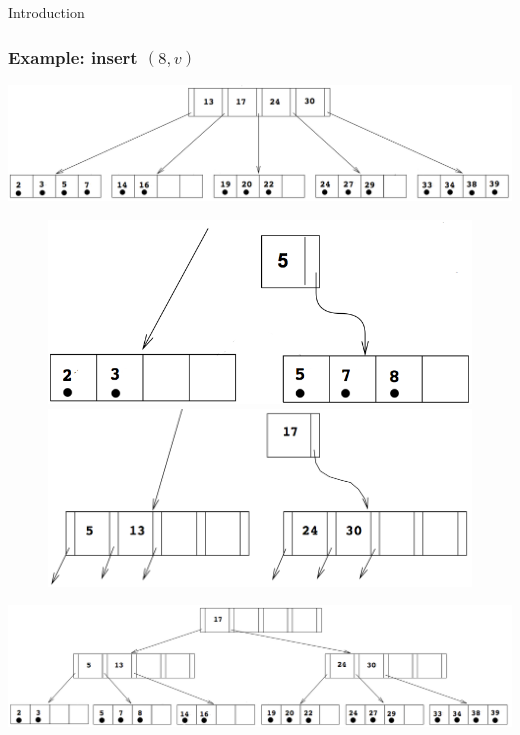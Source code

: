 \documentclass{beamer}
\begin{document}
\begin{section}{Introduction}
    \begin{frame}
      \frametitle{Example: insert $(8,v)$}
      \vspace{-1em}
      \begin{center}
      \includegraphics[scale=0.17]{B+Tree.png}
      \end{center}
      \pause
      \vspace{-2em}
      \begin{figure}[!ht]
        \centering
        \begin{center}
          \includegraphics[valign=t,scale=0.15]{B+Tree_op1.png}
          \quad
          \pause
          \includegraphics[valign=t,scale=0.15]{B+Tree_op2.png}
        \end{center}
      \end{figure}
      \pause

      \begin{center}
      \includegraphics[scale=0.2]{B+Tree_op3.png}
      \end{center}
    \end{frame}
  \end{section}
\end{document}
